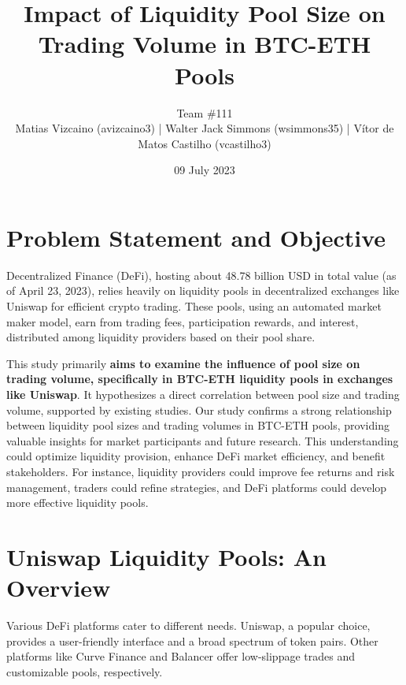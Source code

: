 \documentclass{article}
\makeatletter
\renewcommand{\maketitle}{\bgroup\setlength{\parindent}{0pt}
\begin{center} %
  \Large\@title
  \newline
  \footnotesize\@author
\end{center}
\begin{flushright}
  \@date
\end{flushright}
\egroup}
\makeatother
\begin{document}
\title{Impact of Liquidity Pool Size on Trading Volume in BTC-ETH Pools}
\author{
  Team \#111 \\
   \scriptsize Matias Vizcaino (avizcaino3) | Walter Jack Simmons (wsimmons35) | Vítor de Matos Castilho (vcastilho3)
}
\date{09 July 2023}
\maketitle

\noindent


\section*{\textbf{Problem Statement and Objective}}

Decentralized Finance (DeFi), hosting about 48.78 billion USD in total value (as of April 23, 2023\cite{defillama}), relies heavily on liquidity pools in decentralized exchanges like Uniswap for efficient crypto trading. These pools, using an automated market maker model, earn from trading fees, participation rewards, and interest, distributed among liquidity providers based on their pool share\cite{Miori2022,Aigner2021,Xu2023}.

This study primarily \textbf{aims to examine the influence of pool size on trading volume, specifically in BTC-ETH liquidity pools in exchanges like Uniswap}. It hypothesizes a direct correlation between pool size and trading volume, supported by existing studies\cite{Miori2022,Heimbach2022}. Our study confirms a strong relationship between liquidity pool sizes and trading volumes in BTC-ETH pools, providing valuable insights for market participants and future research. This understanding could optimize liquidity provision, enhance DeFi market efficiency, and benefit stakeholders. For instance, liquidity providers could improve fee returns and risk management, traders could refine strategies, and DeFi platforms could develop more effective liquidity pools\cite{Makarov2022,Miori2023}.

\section{\textbf{Uniswap Liquidity Pools: An Overview}}

Various DeFi platforms cater to different needs. Uniswap, a popular choice, provides a user-friendly interface and a broad spectrum of token pairs. Other platforms like Curve Finance and Balancer offer low-slippage trades and customizable pools, respectively\cite{Xu2023}.
\end{document}
